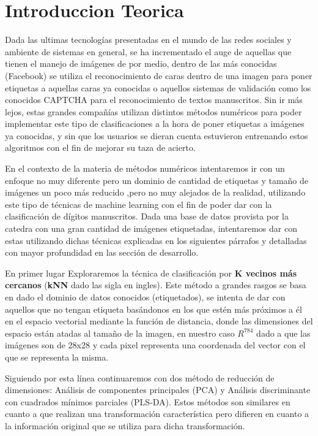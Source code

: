\section{Introduccion Teorica}
Dada las ultimas tecnologías presentadas en el mundo de las redes sociales y ambiente de sistemas en general, se ha incrementado el auge de aquellas que tienen el manejo de imágenes de por medio, dentro de las más conocidas (Facebook) se utiliza el reconocimiento de caras dentro de una imagen para poner etiquetas a aquellas caras ya conocidas o aquellos sistemas de validación como los conocidos CAPTCHA para el reconocimiento de textos manuscritos. Sin ir más lejos, estas grandes compañías utilizan distintos métodos numéricos para poder implementar este tipo de clasificaciones a la hora de poner etiquetas a imágenes ya conocidas, y sin que los usuarios se dieran cuenta estuvieron entrenando estos algoritmos con el fin de mejorar su taza de acierto. 

En el contexto de la materia de métodos numéricos intentaremos ir con un enfoque no muy diferente pero un dominio de cantidad de etiquetas y tamaño de imágenes un poco más reducido ,pero no muy alejados de la realidad, utilizando este tipo de técnicas de machine learning con el fin de poder dar con la clasificación de dígitos manuscritos. Dada una base de datos provista por la catedra con una gran cantidad de imágenes etiquetadas, intentaremos dar con estas utilizando dichas técnicas explicadas en los siguientes párrafos y detalladas con mayor profundidad en las sección de desarrollo. 

En primer lugar Exploraremos la técnica de clasificación por \textbf{K vecinos más cercanos} (\textbf{kNN} dado las sigla en ingles). Este método a grandes rasgos se basa en dado el dominio de datos conocidos (etiquetados), se intenta de dar con aquellos que no tengan etiqueta basándonos en los que estén más próximos a él en el espacio vectorial mediante la función de distancia, donde las dimensiones del espacio están atadas al tamaño de la imagen, en nuestro caso $R^{784}$ dado a que las imágenes son de 28x28 y cada pixel representa una coordenada del vector con el que se representa la misma.

Siguiendo por esta línea continuaremos con dos método de reducción de dimensiones: Análisis de componentes principales (PCA) y Análisis discriminante con cuadrados mínimos parciales (PLS-DA). Estos métodos son similares en cuanto a que realizan una transformación característica pero difieren en cuanto a la información original que se utiliza para dicha transformación. 

